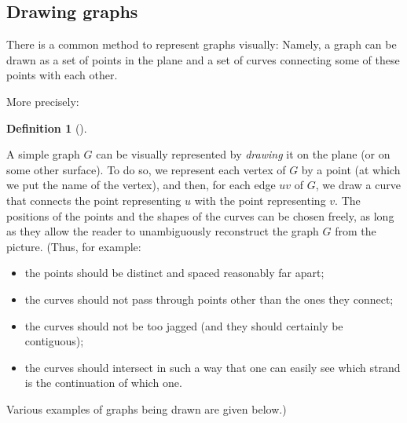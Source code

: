 \documentclass[numbers=enddot,12pt,final,onecolumn,notitlepage]{scrartcl}%
\theoremstyle{definition}
\newtheorem{defi}[theo]{Definition}
\newenvironment{definition}[1][]
{\begin{defi}[#1]\begin{leftbar}}
{\end{leftbar}\end{defi}}
\begin{document}
\subsection{\label{sect.intro.draw}Drawing graphs}

There is a common method to represent graphs visually: Namely, a graph
can be drawn as a set of points in the plane and a set of curves
connecting some of these points with each other.

More precisely:

\begin{definition} \label{def.intro.draw}
A simple graph $G$ can be visually represented by
\textit{drawing} it on the plane (or on some other surface).
To do so, we represent each vertex of $G$ by a point (at which we
put the name of the vertex),
and then, for each edge $uv$ of $G$, we draw a
curve that connects the point representing $u$ with the point
representing $v$. The positions of the points and the shapes of the
curves can be chosen freely, as long as they allow the reader to
unambiguously reconstruct the graph $G$ from the picture.
(Thus, for example:
\begin{itemize}
\item the points should be distinct and spaced
reasonably far apart;
\item the curves should not pass through points other than the ones
they connect;
\item the curves should not be too jagged (and they should certainly
be contiguous);
\item the curves should intersect in such a way that one can easily
see which strand is the continuation of which one.
\end{itemize}
Various examples of graphs being drawn are given below.)
\end{definition}
\end{document}
